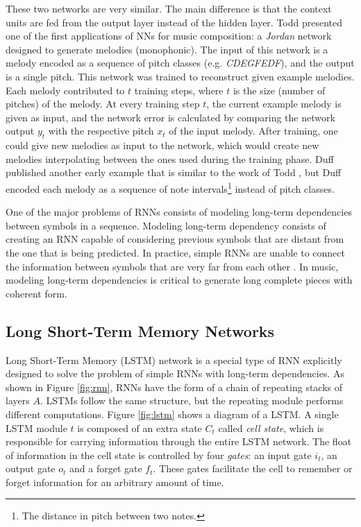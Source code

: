 These two networks are very similar. The main difference is that the context units are fed from the output layer instead of the hidden layer. Todd \cite{todd1989connectionist} presented one of the first applications of NNs for music composition: a \textit{Jordan} network designed to generate melodies (monophonic). The input of this network is a melody encoded as a sequence of pitch classes (e.g. \textit{CDEGFEDF}), and the output is a single pitch. This network was trained to reconstruct given example melodies. Each melody contributed to $t$ training steps, where $t$ is the size (number of pitches) of the melody. At every training step $t$, the current example melody is given as input, and the network error is calculated by comparing the network output $y_t$ with the respective pitch $x_t$ of the input melody. After training, one could give new melodies as input to the network, which would create new melodies interpolating between the ones used during the training phase. Duff \cite{duff1989backpropagation} published another early example that is similar to the work of Todd \cite{todd1989connectionist}, but Duff encoded each melody as a sequence of note intervals\footnote{The distance in pitch between two notes.} instead of pitch classes.

One of the major problems of RNNs consists of modeling long-term dependencies between symbols in a sequence. Modeling long-term dependency consists of creating an RNN capable of considering previous symbols that are distant from the one that is being predicted. In practice, simple RNNs are unable to connect the information between symbols that are very far from each other \cite{bengio1994}. In music, modeling long-term dependencies is critical to generate long complete pieces with coherent form.

\subsection{Long Short-Term Memory Networks}
\label{sec:lstm}

Long Short-Term Memory (LSTM) network \cite{hochreiter1997long} is a special type of RNN explicitly designed to solve the problem of simple RNNs with long-term dependencies. As shown in Figure \ref{fig:rnn}, RNNs have the form of a chain of repeating stacks of layers $A$. LSTMs follow the same structure, but the repeating module performs different computations. Figure \ref{fig:lstm} shows a diagram of a LSTM. A single LSTM module $t$ is composed of an extra state $C_t$ called \textit{cell state}, which is responsible for carrying information through the entire LSTM network. The float of information in the cell state is controlled by four \textit{gates}: an input gate $i_t$, an output gate $o_t$ and a forget gate $f_t$. These gates facilitate the cell to remember or forget information for an arbitrary amount of time.

